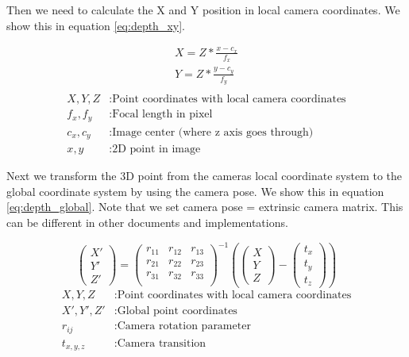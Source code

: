 \documentclass[11pt,a4paper,titlepage,oneside]{report}
\begin{document}
Then we need to calculate the X and Y position in local camera coordinates. We show this in equation \ref{eq:depth_xy}.

\begin{equation}\label{eq:depth_xy}
  \begin{gathered}
    X = Z*\frac{x-c_x}{f_x}\\
    Y = Z*\frac{y-c_y}{f_y}\\
  \end{gathered}
\end{equation}
\begin{align*}
  X,Y,Z    &: \text{Point coordinates with local camera coordinates}\\
  f_x,f_y  &: \text{Focal length in pixel}\\
  c_x,c_y  &: \text{Image center (where z axis goes through)}\\
  x,y      &: \text{2D point in image}
\end{align*}

Next we transform the 3D point from the cameras local coordinate system to the global coordinate system by using the camera pose. We show this in equation \ref{eq:depth_global}. Note that we set camera pose = extrinsic camera matrix. This can be different in other documents and implementations.

\begin{equation}\label{eq:depth_global}
  \begin{pmatrix}
    X'\\
    Y'\\
    Z'
  \end{pmatrix}=
  \begin{pmatrix}
    r_{11} & r_{12} & r_{13}\\
    r_{21} & r_{22} & r_{23}\\
    r_{31} & r_{32} & r_{33}\\
  \end{pmatrix}^{-1}
  \left(
  \begin{pmatrix}
    X\\
    Y\\
    Z
  \end{pmatrix}
  -\begin{pmatrix}
    t_x\\
    t_y\\
    t_z
  \end{pmatrix}
  \right)
\end{equation}
\begin{align*}
  X,Y,Z     &: \text{Point coordinates with local camera coordinates}\\
  X',Y',Z'  &: \text{Global point coordinates}\\
  r_{ij}    &: \text{Camera rotation parameter}\\
  t_{x,y,z} &: \text{Camera transition}
\end{align*}
\end{document}
